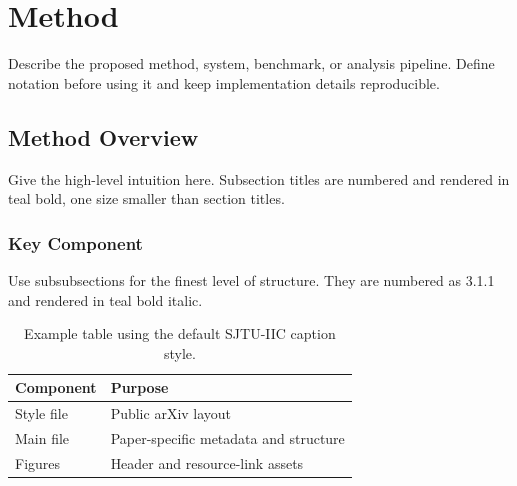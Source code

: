 \section{Method}

Describe the proposed method, system, benchmark, or analysis pipeline. Define
notation before using it and keep implementation details reproducible.

\subsection{Method Overview}

Give the high-level intuition here. Subsection titles are numbered and rendered
in teal bold, one size smaller than section titles.

\subsubsection{Key Component}

Use subsubsections for the finest level of structure. They are numbered as
3.1.1 and rendered in teal bold italic.

\begin{table}[!htb]
  \centering
  \caption{Example table using the default SJTU-IIC caption style.}
  \label{tab:example}
  \begin{tabular}{ll}
    \toprule
    Component & Purpose \\
    \midrule
    Style file & Public arXiv layout \\
    Main file & Paper-specific metadata and structure \\
    Figures & Header and resource-link assets \\
    \bottomrule
  \end{tabular}
\end{table}
